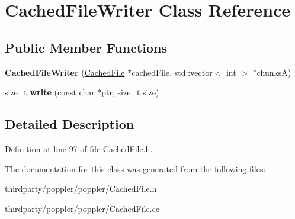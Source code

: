 \hypertarget{class_cached_file_writer}{}\section{Cached\+File\+Writer Class Reference}
\label{class_cached_file_writer}
\subsection*{Public Member Functions}
\begin{DoxyCompactItemize}
\item 
\mbox{\label{class_cached_file_writer_a7c0e630b9f4fb85bd481d7d2855a6590}} 
{\bfseries Cached\+File\+Writer} (\hyperlink{class_cached_file}{Cached\+File} $\ast$cached\+File, std\+::vector$<$ int $>$ $\ast$chunksA)
\item 
\mbox{\label{class_cached_file_writer_af70cd5e79604c7c97319ac83aa2afb79}} 
size\+\_\+t {\bfseries write} (const char $\ast$ptr, size\+\_\+t size)
\end{DoxyCompactItemize}


\subsection{Detailed Description}


Definition at line 97 of file Cached\+File.\+h.



The documentation for this class was generated from the following files\+:\begin{DoxyCompactItemize}
\item 
thirdparty/poppler/poppler/Cached\+File.\+h\item 
thirdparty/poppler/poppler/Cached\+File.\+cc\end{DoxyCompactItemize}
